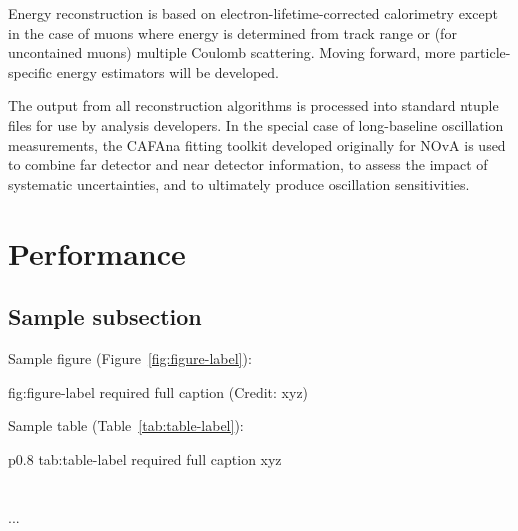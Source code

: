 Energy reconstruction is based on electron-lifetime-corrected calorimetry except in the case of muons where energy is determined from track range or (for uncontained muons) multiple Coulomb scattering.  Moving forward, more particle-specific energy estimators will be developed.

The output from all reconstruction algorithms is processed into standard ntuple files for use by analysis developers.  In the special case of long-baseline oscillation measurements, the CAFAna fitting toolkit developed originally for NOvA is used to combine far detector and near detector information, to assess the impact of systematic uncertainties, and to ultimately produce oscillation sensitivities.


\section{Performance}
\label{sec:exec-summ-strat-perf}



\subsection{Sample subsection}
\label{sec:exec-summ-fix}

Sample figure (Figure~\ref{fig:figure-label}):

\begin{dunefigure}{fig:figure-label}
{required full caption (Credit: xyz)}
\end{dunefigure}

Sample table (Table~\ref{tab:table-label}):

\begin{dunetable}
{p{0.8\textwidth}}
{tab:table-label}
{required full caption}   
xyz  \\ \toprowrule
  \\ \colhline
   \\ \colhline
 ...\\ 
\end{dunetable}
